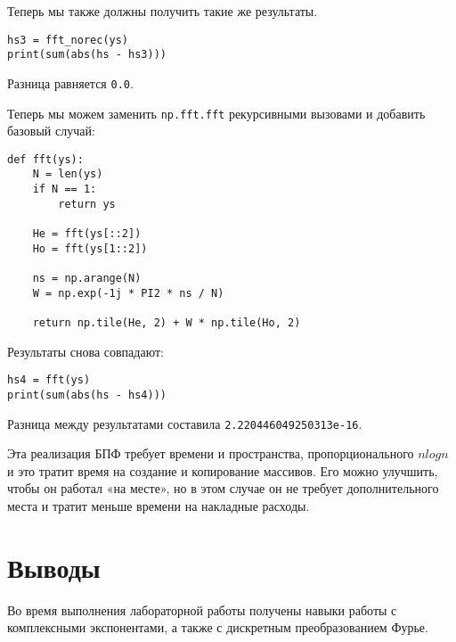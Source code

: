 \documentclass[a4paper,12pt]{report}
\begin{document}
Теперь мы также должны получить такие же результаты.

\begin{lstlisting}[caption=Сравнение реализаций]
hs3 = fft_norec(ys)
print(sum(abs(hs - hs3)))
\end{lstlisting}

Разница равняется \texttt{0.0}.

Теперь мы можем заменить \texttt{np.fft.fft} рекурсивными вызовами и добавить базовый случай:

\begin{lstlisting}[caption=Функция \texttt{fft}]
def fft(ys):
    N = len(ys)
    if N == 1:
        return ys
    
    He = fft(ys[::2])
    Ho = fft(ys[1::2])
    
    ns = np.arange(N)
    W = np.exp(-1j * PI2 * ns / N)
    
    return np.tile(He, 2) + W * np.tile(Ho, 2)
\end{lstlisting}

Результаты снова совпадают:

\begin{lstlisting}[caption=Сравнение реализаций]
hs4 = fft(ys)
print(sum(abs(hs - hs4)))
\end{lstlisting}

Разница между результатами составила \texttt{2.220446049250313e-16}.

Эта реализация БПФ требует времени и пространства, пропорционального $nlogn$ и это тратит время на создание и копирование массивов. Его можно улучшить, чтобы он работал «на месте», но в этом случае он не требует дополнительного места и тратит меньше времени на накладные расходы.

\chapter{Выводы}

Во время выполнения лабораторной работы получены навыки работы с комплексными экспонентами, а также с дискретным преобразованием Фурье.
\end{document}
